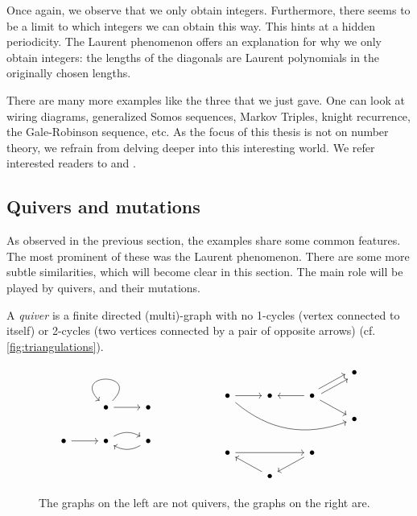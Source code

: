 \documentclass{article}
\begin{document}
%
Once again, we observe that we only obtain integers. Furthermore, there seems to be a
limit to which integers we can obtain this way. This hints at a hidden periodicity. The
Laurent phenomenon offers an explanation for why we only obtain integers: the lengths
of the diagonals are Laurent polynomials in the originally chosen lengths.

There are many more examples like the three that we just gave. One can look at wiring
diagrams, generalized Somos sequences, Markov Triples, knight recurrence, the
Gale-Robinson sequence, etc. As the focus of this thesis is not on number theory, we
refrain from delving deeper into this interesting world. We refer interested readers to
\cite[Chapter 3.4]{FominWilliams2021IntroductionCA_1-3} and
\cite{FominZelevinsky2002Laurent}.

\subsection{Quivers and mutations}

As observed in the previous section, the examples share some common features. The most
prominent of these was the Laurent phenomenon. There are some more subtle similarities,
which will become clear in this section. The main role will be played by quivers, and
their mutations.

\begin{definition}[Quivers]
	A \emph{quiver} is a finite directed (multi)-graph with no 1-cycles (vertex connected to itself) or 2-cycles (two vertices connected by a pair of opposite arrows) (cf. \cref{fig:triangulations}).
\end{definition}

\begin{figure}
	\centering
	\begin{equation*}
		\begin{tikzcd}
			&\bullet \arrow[loop] \arrow[r] &\bullet \\
			\bullet \rar & \bullet \arrow[r, bend left] & \bullet \arrow[l, bend left]
		\end{tikzcd}
		\hspace{2cm}
		\begin{tikzcd}[row sep=small]
			&&& \bullet \\
			\bullet \ar[rrrd, bend right]\rar &\bullet  \rar[leftarrow] &\bullet \ar[ru, shift left] \ar[ru, shift right] \ar[rd] \\
			&&& \bullet\\
			\\
			\bullet \ar[rr] && \bullet \ar[ld]\\
			& \bullet \ar[lu]
		\end{tikzcd}
	\end{equation*}
	\caption{The graphs on the left are not quivers, the graphs on the right are.}
	\label{fig:quivers}
\end{figure}
\end{document}
